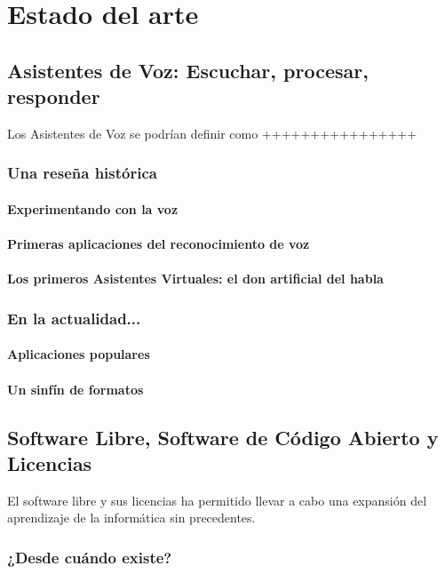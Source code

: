 \chapter{Estado del arte}

\section{Asistentes de Voz: Escuchar, procesar, responder}
Los Asistentes de Voz se podrían definir como ++++++++++++++++
\subsection{Una reseña histórica}
\subsubsection{Experimentando con la voz}

\subsubsection{Primeras aplicaciones del reconocimiento de voz}

\subsubsection{Los primeros Asistentes Virtuales: el don artificial del habla}

\subsection{En la actualidad...}
\subsubsection {Aplicaciones populares}

\subsubsection{Un sinfín de formatos}

\section{Software Libre, Software de Código Abierto y Licencias}
El software libre y sus licencias \cite{gplv3} ha permitido llevar a cabo una expansión del
aprendizaje de la informática sin precedentes.
\subsection{¿Desde cuándo existe?}

